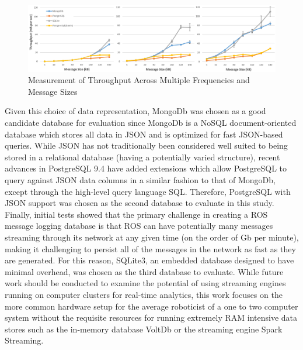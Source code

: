 \documentclass[nocopyrightspace]{acm_proc_article-sp}
\begin{document}
\begin{figure}
    \centering
    \includegraphics[width=\linewidth]{images/throughput}
    \caption{Measurement of Throughput Across Multiple Frequencies and Message Sizes}
    \label{fig:throughput}
\end{figure}

Given this choice of data representation, MongoDb was chosen as a good candidate database for evaluation since MongoDb is a NoSQL document-oriented database which stores all data in JSON and is optimized for fast JSON-based queries. While JSON has not traditionally been considered well suited to being stored in a relational database (having a potentially varied structure), recent advances in PostgreSQL 9.4 have added extensions which allow PostgreSQL to query against JSON data columns in a similar fashion to that of MongoDb, except through the high-level query language SQL. Therefore, PostgreSQL with JSON support was chosen as the second database to evaluate in this study. Finally, initial tests showed that the primary challenge in creating a ROS message logging database is that ROS can have potentially many messages streaming through its network at any given time (on the order of Gb per minute), making it challenging to persist all of the messages in the network as fast as they are generated. For this reason, SQLite3, an embedded database designed to have minimal overhead, was chosen as the third database to evaluate. While future work should be conducted to examine the potential of using streaming engines running on computer clusters for real-time analytics, this work focuses on the more common hardware setup for the average roboticist of a one to two computer system without the requisite resources for running extremely RAM intensive data stores such as the in-memory database VoltDb or the streaming engine Spark Streaming.
\end{document}
